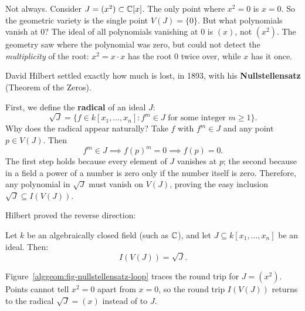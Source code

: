 Not always. Consider $J = (x^2) \subset \mathbb{C}[x]$. The only point where $x^2 = 0$ is $x = 0$. So the geometric variety is the single point $V(J) = \{0\}$. But what polynomials vanish at $0$? The ideal of all polynomials vanishing at $0$ is $(x)$, not $(x^2)$. The geometry saw where the polynomial was zero, but could not detect the \emph{multiplicity} of the root: $x^2 = x \cdot x$ has the root $0$ twice over, while $x$ has it once.

David Hilbert settled exactly how much is lost, in 1893, with his \textbf{Nullstellensatz} (Theorem of the Zeros).

First, we define the \textbf{radical} of an ideal $J$:
\[
\sqrt{J} = \{f \in k[x_1, \dots, x_n] : f^m \in J \text{ for some integer } m \ge 1\}.
\]
Why does the radical appear naturally? Take $f$ with $f^m \in J$ and any point $p \in V(J)$. Then
\[
f^m \in J \implies f(p)^m = 0 \implies f(p) = 0.
\]
The first step holds because every element of $J$ vanishes at $p$; the second because in a field a power of a number is zero only if the number itself is zero. Therefore, any polynomial in $\sqrt{J}$ must vanish on $V(J)$, proving the easy inclusion $\sqrt{J} \subseteq I(V(J))$.

Hilbert proved the reverse direction:

\begin{theorem}
Let $k$ be an algebraically closed field (such as $\mathbb{C}$), and let $J \subseteq k[x_1, \dots, x_n]$ be an ideal. Then:
\[
I(V(J)) = \sqrt{J}.
\]
\end{theorem}

Figure~\ref{alggeom:fig-nullstellensatz-loop} traces the round trip for $J = (x^2)$. Points cannot tell $x^2 = 0$ apart from $x = 0$, so the round trip $I(V(J))$ returns to the radical $\sqrt{J} = (x)$ instead of to $J$.

